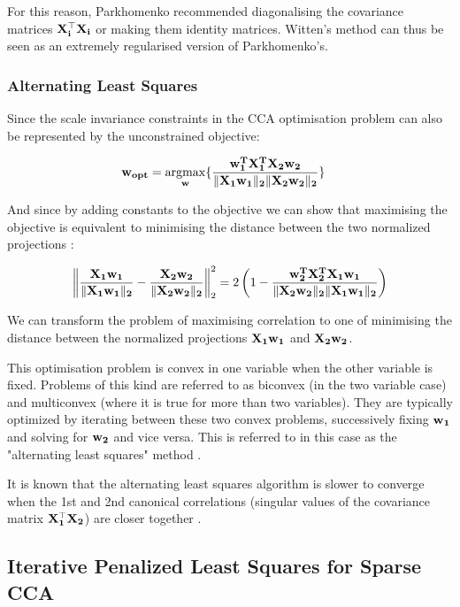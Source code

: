 For this reason, Parkhomenko recommended diagonalising the covariance matrices $\bold{X_i^{\top}X_i}$ or making them identity matrices. Witten's method can thus be seen as an extremely regularised version of Parkhomenko's. 

\subsubsection{Alternating Least Squares}\label{sec:ALS}

Since the scale invariance constraints in the CCA optimisation problem can also be represented by the unconstrained objective: 

\begin{align}
    & \bold{w_{opt}}=\underset{\bold{w}}{\mathrm{argmax}}\{\bold{\frac{\bold{w_1^{T}X_1^{T}X_2w_2}}{\|\bold{X_1w_1}\|_{2}\|\bold{X_2w_2}\|_{2}}}\}
\end{align}

And since by adding constants to the objective we can show that maximising the objective is equivalent to minimising the distance between the two normalized projections \cite{golub1995canonical}:

\begin{align}
    \left\|\bold{\frac{X_1 w_1}{\|X_1 w_1\|_{2}}-\frac{X_2 w_2}{\|X_2 w_2\|_{2}}}\right\|_{2}^{2}=2\left(1-\bold{\frac{w_2^{T} X_2^{T} X_1 w_1}{\|X_2 w_2\|_{2}\|X_1 w_1\|_{2}}}\right)
\end{align}

We can transform the problem of maximising correlation to one of minimising the distance between the normalized projections $\bold{X_1w_1}$ and $\bold{X_2w_2}$.

This optimisation problem is convex in one variable when the other variable is fixed. Problems of this kind are referred to as biconvex (in the two variable case) and multiconvex (where it is true for more than two variables). They are typically optimized by iterating between these two convex problems, successively fixing $\bold{w_1}$ and solving for $\bold{w_2}$ and vice versa. This is referred to in this case as the "alternating least squares" method \cite{lykou2010sparse}. 

It is known that the alternating least squares algorithm is slower to converge when the 1st and 2nd canonical correlations (singular values of the covariance matrix $\bold{X_1^{\top}X_2}$) are closer together \cite{venkatg}.

\subsection{Iterative Penalized Least Squares for Sparse CCA}

